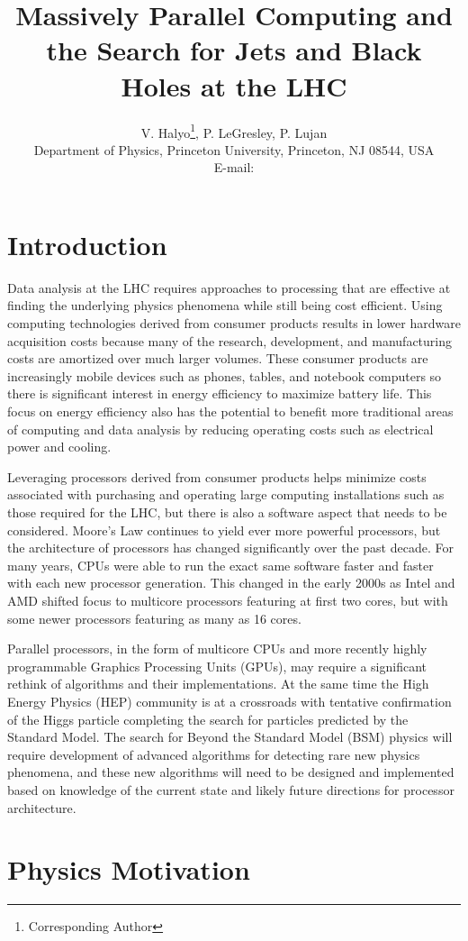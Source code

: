 \documentclass{JINST}
\title{Massively Parallel Computing and the Search for Jets and Black Holes at the LHC}
\author{V. Halyo\thanks{Corresponding Author}, P. LeGresley, P. Lujan \\
\llap Department of Physics, Princeton University, Princeton, NJ 08544, USA \\
E-mail: \email{vhalyo@gmail.com}}
\begin{document}
\section{Introduction} 

Data analysis at the LHC requires approaches to processing that are effective at finding the underlying physics phenomena while still being cost efficient.  Using computing technologies derived from consumer products results in lower hardware acquisition costs because many of the research, development, and manufacturing costs are amortized over much larger volumes.  These consumer products are increasingly mobile devices such as phones, tables, and notebook computers so there is significant interest in energy efficiency to maximize battery life.  This focus on energy efficiency also has the potential to benefit more traditional areas of computing and data analysis by reducing operating costs such as electrical power and cooling.

Leveraging processors derived from consumer products helps minimize costs associated with purchasing and operating large computing installations such as those required for the LHC, but there is also a software aspect that needs to be considered.  Moore's Law continues to yield ever more powerful processors, but the architecture of processors has changed significantly over the past decade.  For many years, CPUs were able to run the exact same software faster and faster with each new processor generation.  This changed in the early 2000s as Intel and AMD shifted focus to multicore processors featuring at first two cores, but with some newer processors featuring as many as 16 cores.

Parallel processors, in the form of multicore CPUs and more recently highly programmable Graphics Processing Units (GPUs), may require a significant rethink of algorithms and their implementations.  At the same time the High Energy Physics (HEP) community is at a crossroads with tentative confirmation of the Higgs particle completing the search for particles predicted by the Standard Model.  The search for Beyond the Standard Model (BSM) physics will require development of advanced algorithms for detecting rare new physics phenomena, and these new algorithms will need to be designed and implemented based on knowledge of the current state and likely future directions for processor architecture.

\section{Physics Motivation}
\end{document}
